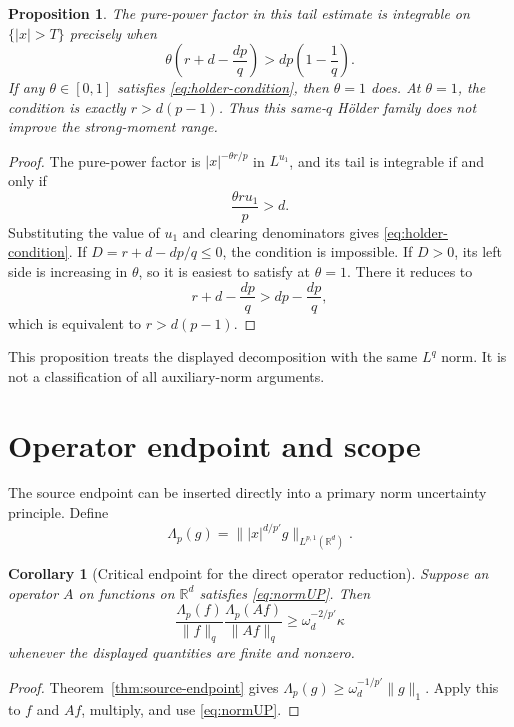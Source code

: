 \documentclass[11pt]{amsart}
\newtheorem{proposition}[theorem]{Proposition}
\newtheorem{corollary}[theorem]{Corollary}
\theoremstyle{remark}
\newcommand{\R}{\mathbb R}
\newcommand{\norm}[1]{\lVert #1\rVert}
\begin{document}
\begin{proposition}\label{prop:holder}
The pure-power factor in this tail estimate is integrable on
$\{|x|>T\}$ precisely when
\begin{equation}\label{eq:holder-condition}
 \theta\left(r+d-\frac{dp}{q}\right)
 >dp\left(1-\frac1q\right).
\end{equation}
If any $\theta\in[0,1]$ satisfies \eqref{eq:holder-condition}, then
$\theta=1$ does.  At $\theta=1$, the condition is exactly
$r>d(p-1)$.  Thus this same-$q$ H\"older family does not improve the
strong-moment range.
\end{proposition}

\begin{proof}
The pure-power factor is $|x|^{-\theta r/p}$ in $L^{u_1}$, and its tail is
integrable if and only if
\[
 \frac{\theta r u_1}{p}>d.
\]
Substituting the value of $u_1$ and clearing denominators gives
\eqref{eq:holder-condition}.  If
$D=r+d-dp/q\le0$, the condition is impossible.  If $D>0$, its left side
is increasing in $\theta$, so it is easiest to satisfy at $\theta=1$.
There it reduces to
\[
 r+d-\frac{dp}{q}>dp-\frac{dp}{q},
\]
which is equivalent to $r>d(p-1)$.
\end{proof}

This proposition treats the displayed decomposition with the same $L^q$
norm.  It is not a classification of all auxiliary-norm arguments.

\section{Operator endpoint and scope}\label{sec:scope}

The source endpoint can be inserted directly into a primary norm uncertainty
principle.  Define
\[
 \Lambda_p(g)=\norm{|x|^{d/p'}g}_{L^{p,1}(\R^d)}.
\]

\begin{corollary}[Critical endpoint for the direct operator reduction]
\label{cor:operator}
Suppose an operator $A$ on functions on $\R^d$ satisfies
\eqref{eq:normUP}.  Then
\begin{equation}\label{eq:operator-endpoint}
 \frac{\Lambda_p(f)}{\norm{f}_q}
 \frac{\Lambda_p(Af)}{\norm{Af}_q}
 \ge \omega_d^{-2/p'}\kappa
\end{equation}
whenever the displayed quantities are finite and nonzero.
\end{corollary}

\begin{proof}
Theorem~\ref{thm:source-endpoint} gives
$\Lambda_p(g)\ge\omega_d^{-1/p'}\norm{g}_1$.  Apply this to $f$ and
$Af$, multiply, and use \eqref{eq:normUP}.
\end{proof}
\end{document}
